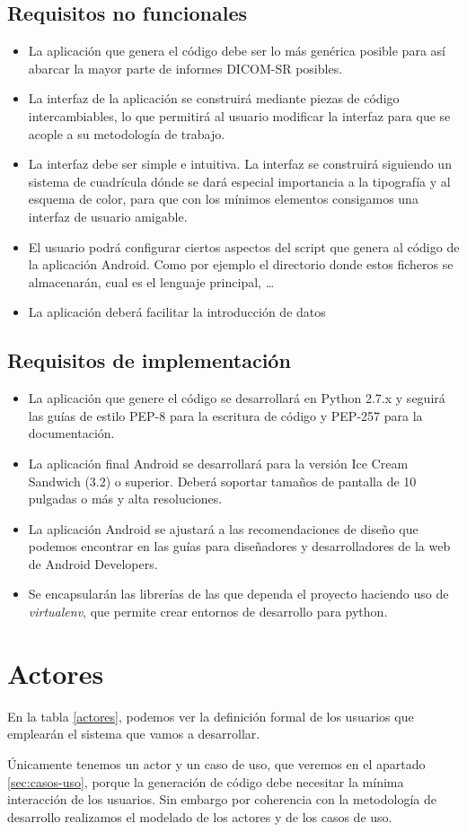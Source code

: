 \subsection{Requisitos no funcionales}
\begin{itemize}
\item La aplicación que genera el código debe ser lo más genérica posible para así abarcar la mayor parte de informes DICOM-SR posibles.
\item La interfaz de la aplicación se construirá mediante piezas de código intercambiables, lo que permitirá al usuario modificar la interfaz para que se acople a su metodología de trabajo.
\item La interfaz debe ser simple e intuitiva. La interfaz se construirá siguiendo un sistema de cuadrícula dónde se dará especial importancia a la tipografía y al esquema de color, para que con los mínimos elementos consigamos una interfaz de usuario amigable. 
\item El usuario podrá configurar ciertos aspectos del script que genera al código de la aplicación Android. Como por ejemplo el directorio donde estos ficheros se almacenarán, cual es el lenguaje principal, \ldots
\item La aplicación deberá facilitar la introducción de datos 
\end{itemize}
\subsection{Requisitos de implementación}\label{req:implementacion}
\begin{itemize}
\item La aplicación que genere el código se desarrollará en Python 2.7.x y seguirá las guías de estilo PEP-8 para la escritura de código y PEP-257 para la documentación.
\item La aplicación final Android se desarrollará para la versión Ice Cream Sandwich (3.2) o superior. Deberá soportar tamaños de pantalla de  10 pulgadas o más y alta resoluciones.
\item La aplicación Android se ajustará a las recomendaciones de diseño que podemos encontrar en las guías para diseñadores y desarrolladores de la web de Android Developers.
\item Se encapsularán las librerías de las que dependa el proyecto haciendo uso de \emph{virtualenv}, que permite crear entornos de desarrollo para python.
\end{itemize}
\section{Actores}\label{sec:actores}
En la tabla \ref{actores}, podemos ver la definición formal de los usuarios que emplearán el sistema que vamos a desarrollar. \par
Únicamente tenemos un actor y un caso de uso, que veremos en el apartado \ref{sec:casos-uso}, porque la generación de código debe necesitar la mínima interacción de los usuarios. Sin embargo por coherencia con la metodología de desarrollo realizamos el modelado de los actores y de los casos de uso.\par


